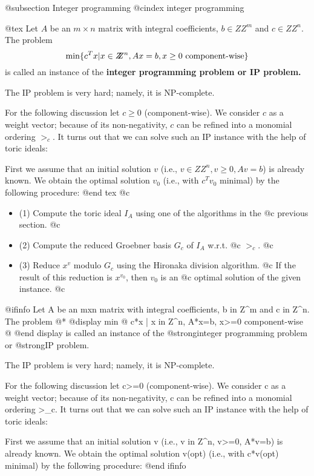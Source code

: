 @subsection Integer programming
@cindex integer programming

@tex
Let $A$ be an $m\times n$ matrix with integral coefficients, $b\in
Z\!\!\! Z^m$ and $c\in Z\!\!\! Z^n$. The problem
$$ \min\{c^T x | x\in Z\!\!\! Z^n, Ax=b, x\geq 0\hbox{
component-wise}\} $$
is called an instance of the \bf integer programming problem \rm or
\bf IP problem. \rm

The IP problem is very hard; namely, it is NP-complete.

For the following discussion let $c\geq 0$ (component-wise). We
consider $c$ as a weight vector; because of its non-negativity, $c$ can
be refined into a monomial ordering $>_c$. It turns out that we can
solve such an IP instance with the help of toric ideals:

First we assume that an initial solution $v$ (i.e., $v\in Z\!\!\!
Z^n, v\geq 0, Av=b$) is already known. We obtain the optimal solution
$v_0$ (i.e., with $c^T v_0$ minimal) by the following procedure:
@end tex
@c \begin{itemize}
@c \item (1) Compute the toric ideal $I_A$ using one of the algorithms in the
@c       previous section.
@c \item (2) Compute the reduced Groebner basis $G_c$ of $I_A$ w.r.t.
@c       $>_c$.
@c \item (3) Reduce $x^v$ modulo $G_c$ using the Hironaka division algorithm.
@c       If the result of this reduction is $x^{v_0}$, then $v_0$ is an
@c       optimal solution of the given instance.
@c \end{itemize}

@ifinfo
Let A be an mxn matrix with integral coefficients, b in Z^m and c in
Z^n. The problem @*
@display
min @{ c*x | x in Z^n, A*x=b, x>=0 component-wise @}
@end display
is called an instance of the @strong{integer programming problem} or
@strong{IP problem}.

The IP problem is very hard; namely, it is NP-complete.

For the following discussion let c>=0 (component-wise). We
consider c as a weight vector; because of its non-negativity, c can
be refined into a monomial ordering >_c. It turns out that we can
solve such an IP instance with the help of toric ideals:

First we assume that an initial solution v (i.e., v in Z^n, v>=0,
A*v=b) is already known. We obtain the optimal solution v(opt) (i.e.,
with c*v(opt) minimal) by the following procedure:
@end ifinfo


